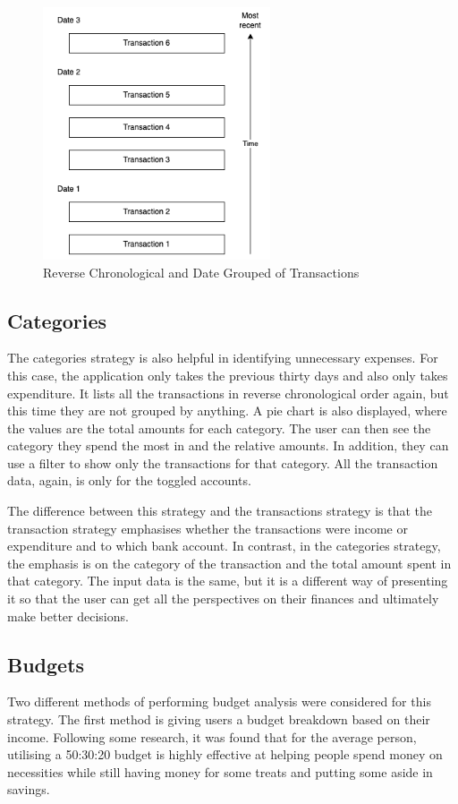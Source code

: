 \begin{figure}[H]
	\centering
	\includegraphics[width=0.6\textwidth]{images/Transaction_labels.png}
	\caption{Reverse Chronological and Date Grouped of Transactions}
	\label{fig:TransactionLabels}
\end{figure}

\subsection{Categories}
The categories strategy is also helpful in identifying unnecessary expenses. For this case, the application only takes the previous thirty days and also only takes expenditure. It lists all the transactions in reverse chronological order again, but this time they are not grouped by anything. A pie chart is also displayed, where the values are the total amounts for each category. The user can then see the category they spend the most in and the relative amounts. In addition, they can use a filter to show only the transactions for that category. All the transaction data, again, is only for the toggled accounts. 

The difference between this strategy and the transactions strategy is that the transaction strategy emphasises whether the transactions were income or expenditure and to which bank account. In contrast, in the categories strategy, the emphasis is on the category of the transaction and the total amount spent in that category. The input data is the same, but it is a different way of presenting it so that the user can get all the perspectives on their finances and ultimately make better decisions.

\subsection{Budgets}
Two different methods of performing budget analysis were considered for this strategy. The first method is giving users a budget breakdown based on their income. Following some research, it was found that for the average person, utilising a 50:30:20 budget is highly effective at helping people spend money on necessities while still having money for some treats and putting some aside in savings.

